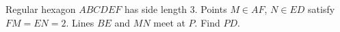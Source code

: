 Regular hexagon $ABCDEF$ has side length $3$. Points $M\in AF$, $N\in ED$ satisfy $FM=EN=2$. Lines $BE$ and $MN$ meet at $P$. Find $PD$.
